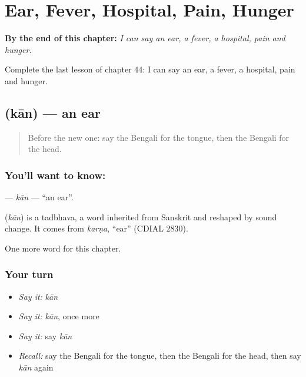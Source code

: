 
\chapter{Ear, Fever, Hospital, Pain, Hunger}
\label{ch:bn-ear-fever-hospital-pain-hunger}

\begin{chapteropening}
\textbf{By the end of this chapter:} \emph{I can say an ear, a fever, a hospital, pain and hunger.}

Complete the last lesson of chapter 44: I can say an ear, a fever, a hospital, pain and hunger.
\end{chapteropening}

\section[\texorpdfstring{\bn{কান} (kān)}{কান (kān)}]{ (kān) — an ear}

\label{lesson:BN-C44-kan}



\begin{quote}
Before the new one: say the Bengali for the tongue, then the Bengali for the head.
\end{quote}

\subsection*{You'll want to know: }
\textbf{} — \emph{kān} — \textquotedblleft{}an ear\textquotedblright{}.

\begin{cousinweb}
\textbf{} (\emph{kān}) is a tadbhava, a word inherited from Sanskrit and reshaped by sound change. It comes from \emph{karṇa}, \textquotedblleft{}ear\textquotedblright{} (CDIAL 2830).
\end{cousinweb}

\begin{grammarlens}[title={What you've built}]
One more word for this chapter.
\end{grammarlens}

\subsection*{Your turn}
\begin{itemize}
\raggedright
  \item \emph{Say it:} \emph{kān}
  \item \emph{Say it:} \emph{kān}, once more
  \item \emph{Say it:} say \emph{kān}
  \item \emph{Recall:} say the Bengali for the tongue, then the Bengali for the head, then say \emph{kān} again
\end{itemize}

